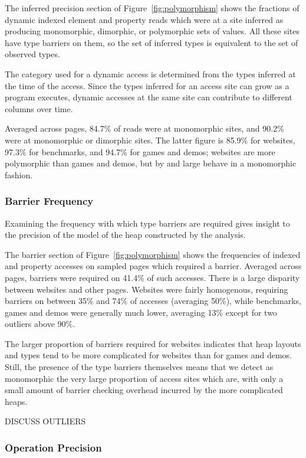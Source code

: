The inferred precision section of Figure~\ref{fig:polymorphism} shows the fractions
of dynamic indexed element and property reads which were at a site inferred
as producing
monomorphic, dimorphic, or polymorphic sets of values.
All these sites have type barriers on them, so the set of inferred types
is equivalent to the set of observed types.

The category used for a dynamic access is determined from the types
inferred at the time of the access.
Since the types inferred for an access site can grow as a program executes,
dynamic accesses at the same site can contribute to different
columns over time.

Averaged across pages, 84.7\% of reads were at monomorphic
sites, and 90.2\% were at monomorphic or dimorphic sites.
The latter figure is 85.9\% for websites, 97.3\% for benchmarks,
and 94.7\% for games and demos; websites are more polymorphic than games
and demos, but by and large behave in a monomorphic fashion.

\subsubsection{Barrier Frequency}
\label{sec:barriers}

Examining the frequency with which type barriers are required
gives insight to the precision of the model of the heap constructed by
the analysis.

The barrier section of Figure~\ref{fig:polymorphism} shows the frequencies of
indexed and property accesses on sampled pages which required a barrier.
Averaged across pages, barriers were required on 41.4\% of such accesses.
There is a large disparity between websites and other pages.
Websites were fairly homogenous, requiring barriers on between 35\%
and 74\% of accesses (averaging 50\%), while benchmarks,
games and demos were generally
much lower, averaging 13\% except for two outliers above 90\%.

The larger proportion of barriers required for websites indicates that
heap layouts and types tend to be more complicated for websites than for
games and demos.
Still, the presence of the type barriers themselves means that we
detect as monomorphic the very large proportion of access sites which are,
with only a small amount of barrier checking overhead incurred by the
more complicated heaps.

DISCUSS OUTLIERS

\subsubsection{Operation Precision}
\label{sec:operations}

